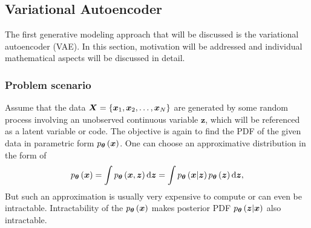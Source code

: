 \subsection{Variational Autoencoder}
The first generative modeling approach that will be discussed is the variational autoencoder (VAE). In this section, motivation will be addressed and individual mathematical aspects will be discussed in detail. 
\subsubsection{Problem scenario}
Assume that the data $\boldsymbol{X}=\left\lbrace \boldsymbol{x}_1,\boldsymbol{x}_2,\dots,\boldsymbol{x}_N \right\rbrace$ are generated by some random process involving an unobserved continuous variable $\boldsymbol{z}$, which will be referenced as a latent variable or code. The objective is again to find the PDF of the given data in parametric form $p_{\boldsymbol{\theta}}\left(\boldsymbol{x}\right)$. One can choose an approximative distribution in the form of
\begin{equation}\label{eq:VAE_approxform}
p_{\boldsymbol{\theta}}\left(\boldsymbol{x}\right) = \int p_{\boldsymbol{\theta}}\left(\boldsymbol{x},  \boldsymbol{z}\right)\mathrm{d}{\boldsymbol{z}} =\int p_{\boldsymbol{\theta}}\left(\boldsymbol{x}\vert \boldsymbol{z}\right)p_{\boldsymbol{\theta}}\left(\boldsymbol{z}\right)\mathrm{d}{\boldsymbol{z}},
\end{equation}
But such an approximation is usually very expensive to compute or can even be intractable. Intractability of the $p_{\boldsymbol{\theta}}\left(\boldsymbol{x}\right)$ makes posterior PDF $p_{\boldsymbol{\theta}}\left(\boldsymbol{z}\vert\boldsymbol{x}\right)$ also intractable.


